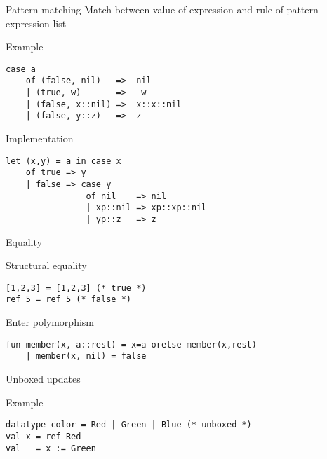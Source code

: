 \documentclass[presentation]{beamer}
\begin{document}
\begin{frame}[fragile,label={sec:orgheadline6}]{Pattern matching}
Match between value of expression and rule of pattern-expression list
  \begin{block}{Example}
\begin{verbatim}
case a
    of (false, nil)   =>  nil
    | (true, w)       =>   w
    | (false, x::nil) =>  x::x::nil
    | (false, y::z)   =>  z
\end{verbatim}
  \end{block}
  \begin{block}{Implementation}
\begin{verbatim}
let (x,y) = a in case x
    of true => y
    | false => case y
                of nil    => nil
                | xp::nil => xp::xp::nil
                | yp::z   => z
\end{verbatim}
  \end{block}
\end{frame}

\begin{frame}[fragile]{Equality}
  \begin{block}{Structural equality}
\begin{verbatim}
[1,2,3] = [1,2,3] (* true *)
ref 5 = ref 5 (* false *)
\end{verbatim}
  \end{block}
  \begin{block}{Enter polymorphism}
\begin{verbatim}
fun member(x, a::rest) = x=a orelse member(x,rest)
    | member(x, nil) = false
\end{verbatim}
  \end{block}
\end{frame}

\begin{frame}[fragile]{Unboxed updates}
  \begin{block}{Example}
\begin{verbatim}
datatype color = Red | Green | Blue (* unboxed *)
val x = ref Red
val _ = x := Green
\end{verbatim}
  \end{block}
\end{frame}
\end{document}
